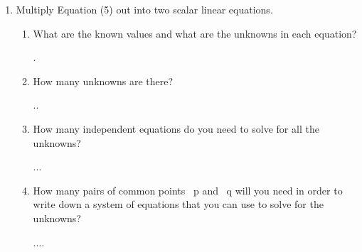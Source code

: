 \documentclass[11pt]{article}
\begin{document}
\begin{enumerate}
\begin{enumerate}
            \item Multiply Equation (5) out into two scalar linear equations.
            \begin{enumerate}
                \item What are the known values and what are the unknowns in each equation?
                    \begin{Answer}
                        .
                    \end{Answer}
                \item How many unknowns are there?
                    \begin{Answer}
                        ..
                    \end{Answer}
                \item How many independent equations do you need to solve for all the unknowns?
                    \begin{Answer}
                        ...
                    \end{Answer}
                \item How many pairs of common points ~p and ~q will you need in order to write down a system of equations that you can use to solve for the unknowns?
                    \begin{Answer}
                        ....
                    \end{Answer}
            \end{enumerate}
            

\end{enumerate}
\end{enumerate}
\end{document}
